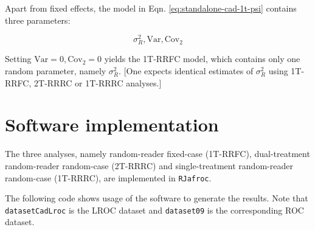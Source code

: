 \documentclass[
]{book}
\begin{document}
Apart from fixed effects, the model in Eqn. \eqref{eq:standalone-cad-1t-psi} contains three parameters:

\begin{equation}
\sigma_R^2, \text{Var}, \text{Cov}_2
\label{eq:standalone-cad-1t-parms}
\end{equation}

Setting \(\text{Var} = 0, \text{Cov}_2 = 0\) yields the 1T-RRFC model, which contains only one random parameter, namely \(\sigma_R^2\).
{[}One expects identical estimates of \(\sigma_R^2\) using 1T-RRFC, 2T-RRRC or 1T-RRRC analyses.{]}

\hypertarget{standalone-cad-radiologists-computational-details}{%
\section{Software implementation}\label{standalone-cad-radiologists-computational-details}}

The three analyses, namely random-reader fixed-case (1T-RRFC), dual-treatment random-reader random-case (2T-RRRC) and single-treatment random-reader random-case (1T-RRRC), are implemented in \texttt{RJafroc}.

The following code shows usage of the software to generate the results. Note that \texttt{datasetCadLroc} is the LROC dataset and \texttt{dataset09} is the corresponding ROC dataset.
\end{document}
